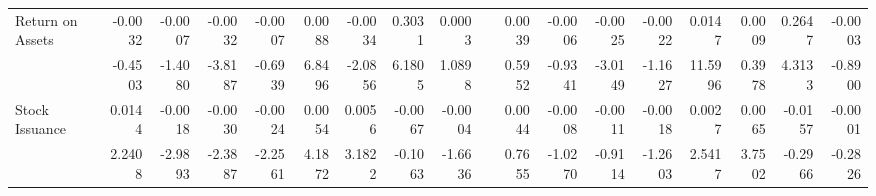 \begin{table}[h]
{\begin{tabular}{lrrrrrrrrrrrrrrrrr}
      Return on Assets & -0.0032 & -0.0007 & -0.0032 & -0.0007 & 0.0088 & -0.0034 & 0.3031 & 0.0003 &       & 0.0039 & -0.0006 & -0.0025 & -0.0022 & 0.0147 & 0.0009 & 0.2647 & -0.0003 \\
            & -0.4503 & -1.4080 & -3.8187 & -0.6939 & 6.8496 & -2.0856 & 6.1805 & 1.0898 &       & 0.5952 & -0.9341 & -3.0149 & -1.1627 & 11.5996 & 0.3978 & 4.3133 & -0.8900 \\
      Stock Issuance & 0.0144 & -0.0018 & -0.0030 & -0.0024 & 0.0054 & 0.0056 & -0.0067 & -0.0004 &       & 0.0044 & -0.0008 & -0.0011 & -0.0018 & 0.0027 & 0.0065 & -0.0157 & -0.0001 \\
            & 2.2408 & -2.9893 & -2.3887 & -2.2561 & 4.1872 & 3.1822 & -0.1063 & -1.6636 &       & 0.7655 & -1.0270 & -0.9114 & -1.2603 & 2.5417 & 3.7502 & -0.2966 & -0.2826 \\
      \bottomrule
      \end{tabular}%
    }
    \label{tab:epu-ff6v}%
  \end{table}%
